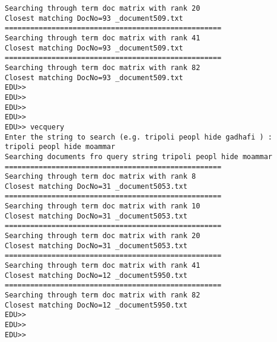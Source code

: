 \documentclass[twoside,11pt]{article}\usepackage{amsmath,amsfonts,amsthm,fullpage}
\begin{document}
\begin{verbatim}
Searching through term doc matrix with rank 20
Closest matching DocNo=93 _document509.txt 
===================================================
Searching through term doc matrix with rank 41
Closest matching DocNo=93 _document509.txt 
===================================================
Searching through term doc matrix with rank 82
Closest matching DocNo=93 _document509.txt 
EDU>> 
EDU>> 
EDU>> 
EDU>> 
EDU>> vecquery
Enter the string to search (e.g. tripoli peopl hide gadhafi ) :
tripoli peopl hide moammar
Searching documents fro query string tripoli peopl hide moammar
===================================================
Searching through term doc matrix with rank 8
Closest matching DocNo=31 _document5053.txt 
===================================================
Searching through term doc matrix with rank 10
Closest matching DocNo=31 _document5053.txt 
===================================================
Searching through term doc matrix with rank 20
Closest matching DocNo=31 _document5053.txt 
===================================================
Searching through term doc matrix with rank 41
Closest matching DocNo=12 _document5950.txt 
===================================================
Searching through term doc matrix with rank 82
Closest matching DocNo=12 _document5950.txt 
EDU>> 
EDU>> 
EDU>> 
\end{verbatim}
\end{document}
